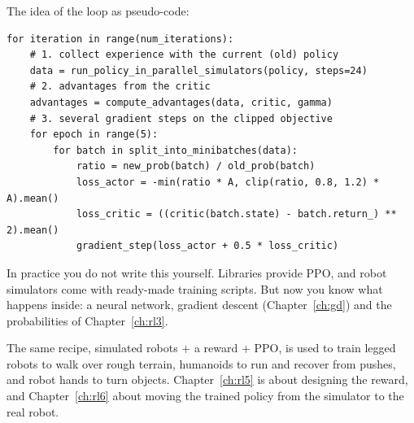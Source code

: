 The idea of the loop as pseudo-code:
\begin{verbatim}
for iteration in range(num_iterations):
    # 1. collect experience with the current (old) policy
    data = run_policy_in_parallel_simulators(policy, steps=24)
    # 2. advantages from the critic
    advantages = compute_advantages(data, critic, gamma)
    # 3. several gradient steps on the clipped objective
    for epoch in range(5):
        for batch in split_into_minibatches(data):
            ratio = new_prob(batch) / old_prob(batch)
            loss_actor = -min(ratio * A, clip(ratio, 0.8, 1.2) * A).mean()
            loss_critic = ((critic(batch.state) - batch.return_) ** 2).mean()
            gradient_step(loss_actor + 0.5 * loss_critic)
\end{verbatim}
In practice you do not write this yourself. Libraries provide PPO, and robot simulators come with ready-made training scripts. But now you know what happens inside: a neural network, gradient descent (Chapter~\ref{ch:gd}) and the probabilities of Chapter~\ref{ch:rl3}.

\begin{aibox}
The same recipe, simulated robots $+$ a reward $+$ PPO, is used to train legged robots to walk over rough terrain, humanoids to run and recover from pushes, and robot hands to turn objects. Chapter~\ref{ch:rl5} is about designing the reward, and Chapter~\ref{ch:rl6} about moving the trained policy from the simulator to the real robot.
\end{aibox}

